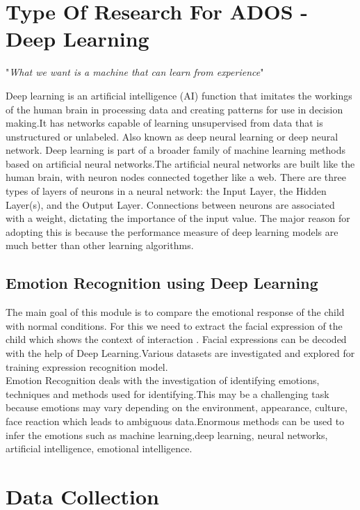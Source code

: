 \section{Type Of Research For ADOS - Deep Learning}
\begin{center}
    "\emph{What we want is a machine that can learn from experience}"
\end{center}    
Deep learning is an artificial intelligence (AI) function that imitates the workings of the human brain in processing data and creating patterns for use in decision making.It has networks capable of learning unsupervised from data that is unstructured or unlabeled. Also known as deep neural learning or deep neural network.
Deep learning is part of a broader family of machine learning methods based on artificial neural networks.The artificial neural networks are built like the human brain, with neuron nodes connected together like a web. There are three types of layers of neurons in a neural network: the Input Layer, the Hidden Layer(s), and the Output Layer. Connections between neurons are associated with a weight, dictating the importance of the input value. The major reason for adopting  this is because the performance measure of deep learning models are much better than other learning algorithms.\\




\subsection{Emotion Recognition using Deep Learning}
The main goal of this module is to compare the emotional response of the child with normal conditions. For this we need to extract the facial expression of the child which shows the context of interaction . Facial expressions can be decoded with the help of Deep Learning.Various datasets are investigated and explored for training expression recognition model.\\
Emotion Recognition deals with the investigation of identifying emotions, techniques and methods used for identifying.This may be a challenging task because emotions may vary depending on the environment, appearance, culture, face reaction which leads to ambiguous data.Enormous methods can be used to infer the emotions such as machine learning,deep learning, neural networks, artificial intelligence, emotional intelligence.
\section{Data Collection}

